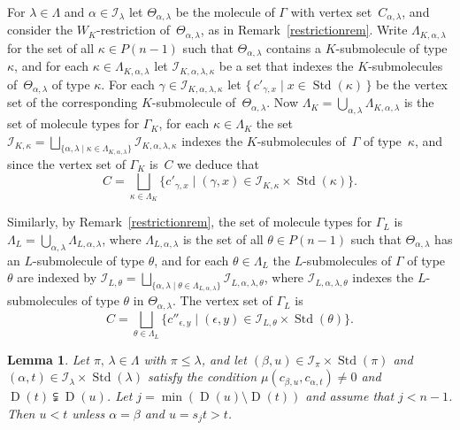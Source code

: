 \documentclass[10pt]{amsart}
\newtheorem{lemm}[theo]{Lemma}
\theoremstyle{definition}
\DeclareMathOperator{\STD}{Std}
\DeclareMathOperator{\D}{D}
\begin{document}
For $\lambda\in\Lambda$ and $\alpha\in\mathcal{I}_\lambda$ let $\Theta_{\alpha,\lambda}$
be the molecule of $\Gamma$ with vertex set~$C_{\alpha,\lambda}$, and consider
the $W_K$-restriction of~$\Theta_{\alpha,\lambda}$, as in Remark~\ref{restrictionrem}.
Write $\Lambda_{K,\alpha,\lambda}$ for the set of all $\kappa\in P(n-1)$
such that $\Theta_{\alpha,\lambda}$ contains a $K$-submolecule of type $\kappa$,
and for each $\kappa\in\Lambda_{K,\alpha,\lambda}$ let $\mathcal{I}_{K,\alpha,\lambda,\kappa}$
be a set that indexes the $K$-submolecules of~$\Theta_{\alpha,\lambda}$ of type $\kappa$.
For each $\gamma\in\mathcal{I}_{K,\alpha,\lambda,\kappa}$ let
$\{\,c'_{\gamma,x}\mid x\in\STD(\kappa)\,\}$ be the vertex set of the corresponding
$K$-submolecule of~$\Theta_{\alpha,\lambda}$. Now
$\Lambda_K=\bigcup_{\alpha,\lambda}\Lambda_{K,\alpha,\lambda}$ is the set of molecule
types for $\Gamma_K$, for each $\kappa\in\Lambda_K$ the set
$\mathcal{I}_{K,\kappa}=\bigsqcup_{\{\alpha,\lambda\mid \kappa\in\Lambda_{K,\alpha,\lambda}\}}\mathcal{I}_{K,\alpha,\lambda,\kappa}$
indexes the $K$-submolecules of~$\Gamma$ of type~$\kappa$, and since the vertex set of
$\Gamma_K$ is~$C$ we deduce that
\begin{equation}\label{verticesofGammaK}
C = \bigsqcup_{\kappa\in\Lambda_K}\{c'_{\gamma,x}\mid (\gamma,x)\in\mathcal{I}_{K,\kappa}\times\STD(\kappa)\}.
\end{equation}

Similarly, by Remark~\ref{restrictionrem}, the set of molecule types for $\Gamma_L$ is
$\Lambda_L=\bigcup_{\alpha,\lambda}\Lambda_{L,\alpha,\lambda}$,
where $\Lambda_{L,\alpha,\lambda}$ is the set of all $\theta\in P(n-1)$
such that $\Theta_{\alpha,\lambda}$ has an $L$-submolecule of type $\theta$, and
for each $\theta\in\Lambda_L$ the $L$-submolecules of $\Gamma$ of type $\theta$
are indexed by
$\mathcal{I}_{L,\theta}=\bigsqcup_{\{\alpha,\lambda\mid \theta\in\Lambda_{L,\alpha,\lambda}\}}
\mathcal{I}_{L,\alpha,\lambda,\theta}$, where $\mathcal{I}_{L,\alpha,\lambda,\theta}$
indexes the $L$-submolecules of type $\theta$ in $\Theta_{\alpha,\lambda}$. The vertex
set of $\Gamma_L$ is
\begin{equation}\label{verticesofGammaL}
C = \bigsqcup_{\theta\in\Lambda_L}\{c''_{\epsilon,y}\mid (\epsilon,y)\in\mathcal{I}_{L,\theta}\times\STD(\theta)\}.
\end{equation}

\begin{lemm}\label{kldominancesamenolecule0}
Let $\pi,\,\lambda\in\Lambda$ with $\pi\leqslant\lambda$, and
let $(\beta,u)\in\mathcal{I}_{\pi}\times\STD(\pi)$ and
$(\alpha,t)\in\mathcal{I}_{\lambda}\times\STD(\lambda)$ satisfy the condition
$\mu(c_{\beta,u},c_{\alpha,t}) \neq 0$ and $\D(t) \subsetneqq \D(u)$.
Let $j=\min(\D(u)\setminus\D(t))$ and assume that $j<n-1$. Then $u < t$ unless
$\alpha = \beta$ and $u=s_j t>t$.
\end{lemm}
\end{document}
